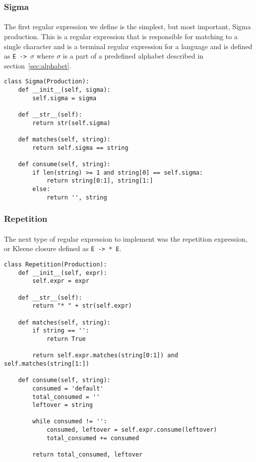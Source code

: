 \documentclass{article}
\begin{document}
\subsubsection{Sigma}
\label{sec:algos:regex:sigma}
\paragraph{} The first regular expression we define is the simplest, 
but most important, Sigma production. This is a regular expression
that is responsible for matching to a single character and is a terminal 
regular expression for a language and is defined as \verb|E -> |$\sigma$ where $\sigma$ is a part of a predefined alphabet described in section~\ref{sec:alphabet}. 

\begin{verbatim}
class Sigma(Production):
    def __init__(self, sigma):
        self.sigma = sigma

    def __str__(self):
        return str(self.sigma)

    def matches(self, string):
        return self.sigma == string

    def consume(self, string):
        if len(string) >= 1 and string[0] == self.sigma:
            return string[0:1], string[1:]
        else:
            return '', string
\end{verbatim}

\subsubsection{Repetition}
\label{sec:algos:regex:rep}
\paragraph{} The next type of regular expression to implement was the 
repetition expression, or Kleene closure defined as \verb|E -> * E|. 

\begin{verbatim}
class Repetition(Production):
    def __init__(self, expr):
        self.expr = expr
    
    def __str__(self):
        return "* " + str(self.expr)

    def matches(self, string):
        if string == '':
            return True

        return self.expr.matches(string[0:1]) and self.matches(string[1:])
        
    def consume(self, string):
        consumed = 'default'
        total_consumed = ''
        leftover = string

        while consumed != '':
            consumed, leftover = self.expr.consume(leftover)
            total_consumed += consumed

        return total_consumed, leftover
\end{verbatim}
\end{document}
